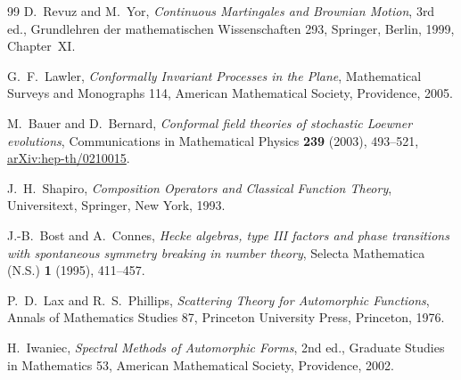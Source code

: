 \begin{thebibliography}{99}
D.~Revuz and M.~Yor, \emph{Continuous Martingales and Brownian Motion},
3rd ed., Grundlehren der mathematischen Wissenschaften 293, Springer, Berlin,
1999, Chapter~XI.

G.~F.~Lawler, \emph{Conformally Invariant Processes in the Plane},
Mathematical Surveys and Monographs 114, American Mathematical Society,
Providence, 2005.

M.~Bauer and D.~Bernard, \emph{Conformal field theories of stochastic Loewner
evolutions}, Communications in Mathematical Physics \textbf{239} (2003),
493--521, \href{https://arxiv.org/abs/hep-th/0210015}{arXiv:hep-th/0210015}.

J.~H.~Shapiro, \emph{Composition Operators and Classical Function Theory},
Universitext, Springer, New York, 1993.

J.-B.~Bost and A.~Connes, \emph{Hecke algebras, type III factors and phase
transitions with spontaneous symmetry breaking in number theory}, Selecta
Mathematica (N.S.) \textbf{1} (1995), 411--457.

P.~D.~Lax and R.~S.~Phillips, \emph{Scattering Theory for Automorphic
Functions}, Annals of Mathematics Studies 87, Princeton University Press,
Princeton, 1976.

H.~Iwaniec, \emph{Spectral Methods of Automorphic Forms}, 2nd ed., Graduate
Studies in Mathematics 53, American Mathematical Society, Providence, 2002.
\end{thebibliography}
